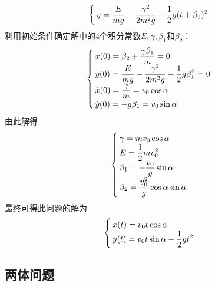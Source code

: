 \begin{solution}
\begin{equation*}
\begin{cases}
	\displaystyle y = \frac{E}{mg}-\frac{\gamma^2}{2m^2g} - \frac12 g(t+\beta_1)^2
\end{cases}
\end{equation*}
利用初始条件确定解中的4个积分常数$E, \gamma, \beta_1$和$\beta_2$：
\begin{equation*}
\begin{cases}
	\displaystyle x(0) = \beta_2+\frac{\gamma\beta_1}{m} = 0 \\
	\displaystyle y(0) = \frac{E}{mg}-\frac{\gamma^2}{2m^2g} - \frac12 g\beta_1^2 = 0 \\
	\displaystyle \dot{x}(0) = \frac{\gamma}{m} = v_0\cos\alpha \\
	\displaystyle \dot{y}(0) = -g\beta_1 = v_0\sin\alpha
\end{cases}
\end{equation*}
由此解得
\begin{equation*}
\begin{cases}
	\displaystyle \gamma = mv_0\cos\alpha \\
	\displaystyle E = \frac12 mv_0^2 \\
	\displaystyle \beta_1 = -\frac{v_0}{g}\sin\alpha \\
	\displaystyle \beta_2 = \frac{v_0^2}{g}\cos\alpha\sin\alpha
\end{cases}
\end{equation*}
最终可得此问题的解为
\begin{equation*}
\begin{cases}
	\displaystyle x(t) = v_0t\cos\alpha \\
	\displaystyle y(t) = v_0t\sin\alpha - \frac12 gt^2
\end{cases}
\end{equation*}
\end{solution}

\subsection{两体问题}

